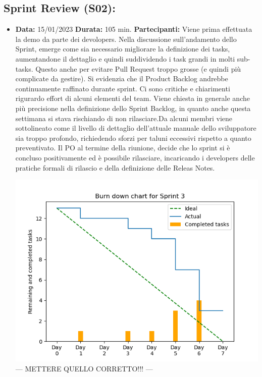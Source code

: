 \begin{landscape}
        \subsection{Sprint Review (S02):}
        \begin{itemize}
            \item \textbf{Data:} 15/01/2023
            \newline \textbf{Durata:} 105 min.
            \newline \textbf{Partecipanti:}  \dueP \due
            \newline
            \newline Viene prima effettuata la demo da parte dei devolopers. Nella discussione sull'andamento dello Sprint, emerge come sia necessario migliorare la definizione dei tasks, aumentandone il dettaglio e quindi suddividendo i task grandi in molti sub-tasks. Questo anche per evitare Pull Request troppo grosse (e quindi più complicate da gestire). Si evidenzia che il Product Backlog andrebbe continuamente raffinato durante sprint. Ci sono critiche e chiarimenti rigurardo effort di alcuni elementi del team. Viene chiesta in generale anche più precisione nella definizione dello Sprint Backlog, in quanto anche questa settimana si stava rischiando di non rilasciare.Da alcuni membri viene sottolineato come il livello di dettaglio dell'attuale manuale dello sviluppatore sia troppo profondo, richiedendo sforzi per taluni eccessivi rispetto a quanto preventivato. Il PO al termine della riunione, decide che lo sprint si è concluso positivamente ed è possibile rilasciare, incaricando i developers delle pratiche formali di rilascio e della definizione delle Releas Notes.

            \includegraphics[scale=0.8]{Sprint03_BurnDownChart}
            --- METTERE QUELLO CORRETTO!!! ---


\end{itemize}
\end{landscape}
